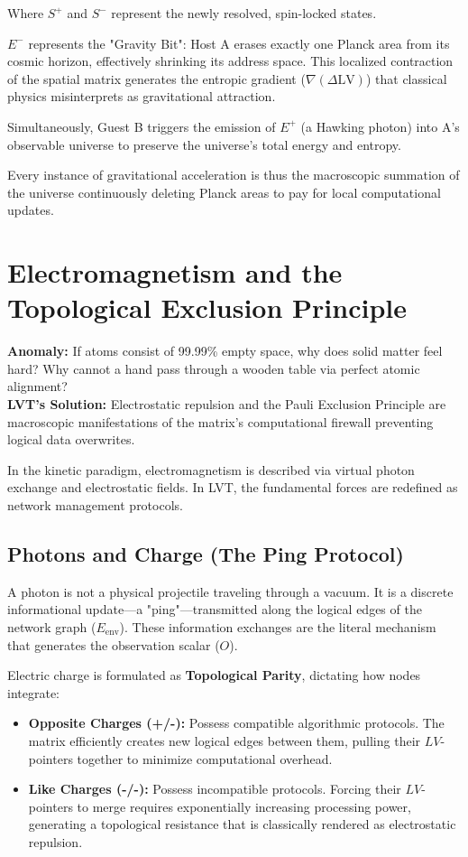 \documentclass[12pt,a4paper]{article}
\begin{document}
Where $S^{+}$ and $S^{-}$ represent the newly resolved, spin-locked states. 

$E^{-}$ represents the "Gravity Bit": Host A erases exactly one Planck area from its cosmic horizon, effectively shrinking its address space. This localized contraction of the spatial matrix generates the entropic gradient ($\nabla(\Delta \mathrm{LV})$) that classical physics misinterprets as gravitational attraction.

Simultaneously, Guest B triggers the emission of $E^{+}$ (a Hawking photon) into A's observable universe to preserve the universe's total energy and entropy.

Every instance of gravitational acceleration is thus the macroscopic summation of the universe continuously deleting Planck areas to pay for local computational updates.


\section{Electromagnetism and the Topological Exclusion Principle}

\textbf{Anomaly:} If atoms consist of 99.99\% empty space, why does solid matter feel hard? Why cannot a hand pass through a wooden table via perfect atomic alignment? \\
\textbf{LVT's Solution:} Electrostatic repulsion and the Pauli Exclusion Principle are macroscopic manifestations of the matrix's computational firewall preventing logical data overwrites.

In the kinetic paradigm, electromagnetism is described via virtual photon exchange and electrostatic fields. In LVT, the fundamental forces are redefined as network management protocols.

\subsection{Photons and Charge (The Ping Protocol)}
A photon is not a physical projectile traveling through a vacuum. It is a discrete informational update—a "ping"—transmitted along the logical edges of the network graph ($E_{\mathrm{env}}$). These information exchanges are the literal mechanism that generates the observation scalar ($O$).

Electric charge is formulated as \textbf{Topological Parity}, dictating how nodes integrate:
\begin{itemize}
    \item \textbf{Opposite Charges (+/-):} Possess compatible algorithmic protocols. The matrix efficiently creates new logical edges between them, pulling their $LV$-pointers together to minimize computational overhead.
    \item \textbf{Like Charges (-/-):} Possess incompatible protocols. Forcing their $LV$-pointers to merge requires exponentially increasing processing power, generating a topological resistance that is classically rendered as electrostatic repulsion.
\end{itemize}
\end{document}
